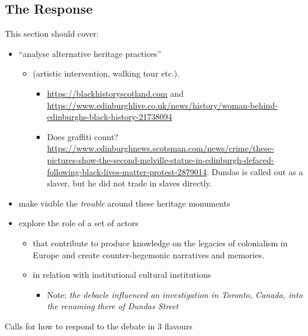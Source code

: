 
\subsection{The Response}

This section should cover:

\begin{itemize}
    \item ``analyse alternative heritage practices''
    \begin{itemize}
        \item  (artistic intervention, walking tour etc.).
        \begin{itemize}            
                \item \url{https://blackhistoryscotland.com} and \url{https://www.edinburghlive.co.uk/news/history/woman-behind-edinburghs-black-history-21738094}          
        \end{itemize}
        \begin{itemize}
            \item Does graffiti count? \url{https://www.edinburghnews.scotsman.com/news/crime/these-pictures-show-the-second-melville-statue-in-edinburgh-defaced-following-black-lives-matter-protest-2879014}. Dundas is called out as a slaver, but he did not trade in slaves directly.
        \end{itemize}
    \end{itemize}
    \item make visible the \textit{trouble} around these heritage monuments
    \item explore the role of a set of actors
    \begin{itemize}
        \item that contribute to produce knowledge on the legacies of colonialism in Europe and create counter-hegemonic narratives and memories.
        \item in relation with institutional cultural institutions
        \begin{itemize}
            \item Note: \textit{the debacle influenced an investigation in Toronto, Canada, into the renaming there of Dundas Street} \cite{mccarthy_2022_1}
        \end{itemize}
    \end{itemize}
\end{itemize}

Calls for how to respond to the debate in 3 flavours

